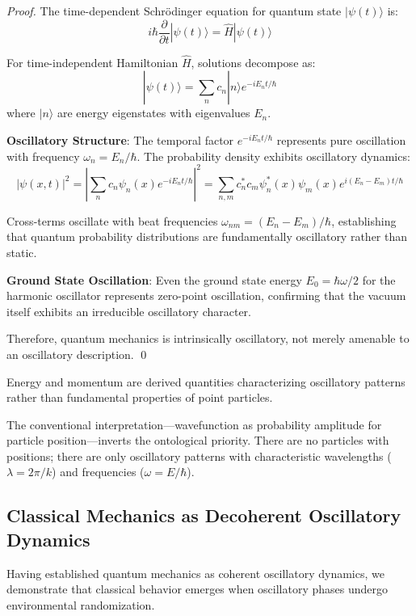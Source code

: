 \begin{proof}
The time-dependent Schrödinger equation for quantum state $|\psi(t)\rangle$ is:
$$i\hbar \frac{\partial}{\partial t}|\psi(t)\rangle = \hat{H}|\psi(t)\rangle$$

For time-independent Hamiltonian $\hat{H}$, solutions decompose as:
$$|\psi(t)\rangle = \sum_n c_n |n\rangle e^{-iE_n t/\hbar}$$
where $|n\rangle$ are energy eigenstates with eigenvalues $E_n$.

\textbf{Oscillatory Structure}: The temporal factor $e^{-iE_n t/\hbar}$ represents pure oscillation with frequency $\omega_n = E_n/\hbar$. The probability density exhibits oscillatory dynamics:
$$|\psi(x,t)|^2 = \left|\sum_n c_n \psi_n(x) e^{-iE_n t/\hbar}\right|^2 = \sum_{n,m} c_n^* c_m \psi_n^*(x) \psi_m(x) e^{i(E_n - E_m)t/\hbar}$$

Cross-terms oscillate with beat frequencies $\omega_{nm} = (E_n - E_m)/\hbar$, establishing that quantum probability distributions are fundamentally oscillatory rather than static.

\textbf{Ground State Oscillation}: Even the ground state energy $E_0 = \hbar\omega/2$ for the harmonic oscillator represents zero-point oscillation, confirming that the vacuum itself exhibits an irreducible oscillatory character.

Therefore, quantum mechanics is intrinsically oscillatory, not merely amenable to an oscillatory description. \qed
\end{proof}

\begin{corollary}
Energy and momentum are derived quantities characterizing oscillatory patterns rather than fundamental properties of point particles.
\end{corollary}

The conventional interpretation—wavefunction as probability amplitude for particle position—inverts the ontological priority. There are no particles with positions; there are only oscillatory patterns with characteristic wavelengths ($\lambda = 2\pi/k$) and frequencies ($\omega = E/\hbar$).

\subsection{Classical Mechanics as Decoherent Oscillatory Dynamics}

Having established quantum mechanics as coherent oscillatory dynamics, we demonstrate that classical behavior emerges when oscillatory phases undergo environmental randomization.

